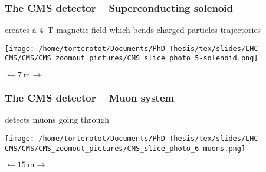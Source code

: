 \begin{frame}\addtocounter{framenumber}{-1}
\frametitle{The CMS detector -- Superconducting solenoid}
\begin{center}
creates a \SI{4}{\tesla} magnetic field which bends charged particles trajectories

\vfill

\texttt{[image: /home/torterotot/Documents/PhD-Thesis/tex/slides/LHC-CMS/CMS/CMS\_zoomout\_pictures/CMS\_slice\_photo\_5-solenoid.png]}

\vfill

$\longleftarrow \SI{7}{\meter} \longrightarrow$
\end{center}
\end{frame}
\begin{frame}\addtocounter{framenumber}{-1}
\frametitle{The CMS detector -- Muon system}
\begin{center}
detects muons going through

\vfill

\texttt{[image: /home/torterotot/Documents/PhD-Thesis/tex/slides/LHC-CMS/CMS/CMS\_zoomout\_pictures/CMS\_slice\_photo\_6-muons.png]}

\vfill

$\longleftarrow \SI{15}{\meter} \longrightarrow$
\end{center}
\end{frame}